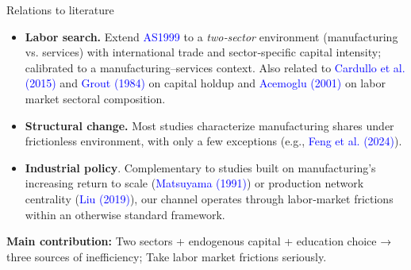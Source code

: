 \documentclass[9pt,xcolor={svgnames}]{beamer}
\begin{document}
\begin{frame}{Relations to literature}

\begin{itemize}
    \item \textbf{Labor search.}   Extend \textcolor{blue}{AS1999} to a \emph{two‐sector} environment (manufacturing vs. services) with international trade and sector‐specific capital intensity; calibrated to a manufacturing–services context. Also related to \textcolor{blue}{Cardullo et al. (2015)} and \textcolor{blue}{Grout (1984)} on capital holdup and \textcolor{blue}{Acemoglu (2001)} on labor market sectoral composition.

    \medskip

    \item \textbf{Structural change.} Most studies   characterize manufacturing shares under frictionless environment, with only a few exceptions (e.g., \textcolor{blue}{Feng et al. (2024)}). %

\medskip

    \item \textbf{Industrial policy}.  Complementary to studies built on manufacturing's increasing return to scale (\textcolor{blue}{Matsuyama (1991)}) or production network centrality (\textcolor{blue}{Liu (2019)}), our channel operates through labor‐market frictions within an otherwise standard framework.
\end{itemize}

\vspace{1em}
\textbf{Main contribution:} Two sectors + endogenous capital + education choice → three sources of inefficiency; Take labor market frictions seriously. 

\end{frame}
\end{document}
